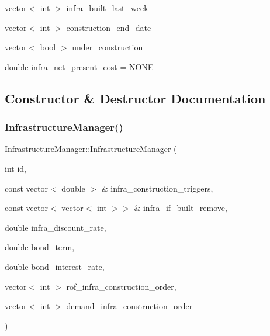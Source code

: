\begin{DoxyCompactItemize}
\item 
vector$<$ int $>$ \mbox{\hyperlink{classInfrastructureManager_a5203fc0ae8e33885012415c1d0e27399_a5203fc0ae8e33885012415c1d0e27399}{infra\+\_\+built\+\_\+last\+\_\+week}}
\item 
vector$<$ int $>$ \mbox{\hyperlink{classInfrastructureManager_abe5accdeeb4343266335d208d41704ae_abe5accdeeb4343266335d208d41704ae}{construction\+\_\+end\+\_\+date}}
\item 
vector$<$ bool $>$ \mbox{\hyperlink{classInfrastructureManager_a634ca1b01e1b7fa7c8b5468c9a842a51_a634ca1b01e1b7fa7c8b5468c9a842a51}{under\+\_\+construction}}
\item 
double \mbox{\hyperlink{classInfrastructureManager_a959efbe51589414916d96b99bf5559cc_a959efbe51589414916d96b99bf5559cc}{infra\+\_\+net\+\_\+present\+\_\+cost}} = N\+O\+NE
\end{DoxyCompactItemize}


\subsection{Constructor \& Destructor Documentation}
\mbox{\label{classInfrastructureManager_a2720f467b660e0f63f265e7957ca0139_a2720f467b660e0f63f265e7957ca0139}} 
\subsubsection{\texorpdfstring{Infrastructure\+Manager()}{InfrastructureManager()}\hspace{0.1cm}{\footnotesize\ttfamily [1/3]}}
{\footnotesize\ttfamily Infrastructure\+Manager\+::\+Infrastructure\+Manager (\begin{DoxyParamCaption}\item[{int}]{id,  }\item[{const vector$<$ double $>$ \&}]{infra\+\_\+construction\+\_\+triggers,  }\item[{const vector$<$ vector$<$ int $>$$>$ \&}]{infra\+\_\+if\+\_\+built\+\_\+remove,  }\item[{double}]{infra\+\_\+discount\+\_\+rate,  }\item[{double}]{bond\+\_\+term,  }\item[{double}]{bond\+\_\+interest\+\_\+rate,  }\item[{vector$<$ int $>$}]{rof\+\_\+infra\+\_\+construction\+\_\+order,  }\item[{vector$<$ int $>$}]{demand\+\_\+infra\+\_\+construction\+\_\+order }\end{DoxyParamCaption})}

